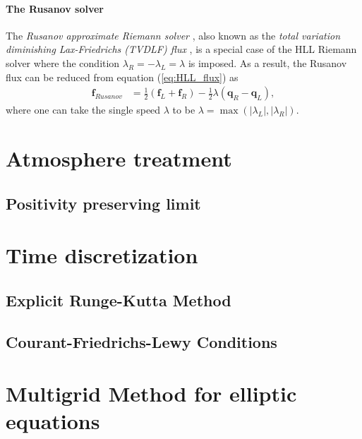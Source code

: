 \paragraph{The Rusanov solver}
The \textit{Rusanov approximate Riemann solver} \cite{rusanov1962calculation},
also known as the \textit{total variation diminishing Lax-Friedrichs (TVDLF) flux} \cite{shu1989efficient},
is a special case of the HLL Riemann solver where the condition $\lambda_R = -\lambda_L = \lambda$ is imposed.
As a result, the Rusanov flux can be reduced from equation (\ref{eq:HLL_flux}) as
\begin{align}
    \mathbf{f}_{Rusanov} &= \frac{1}{2}\left(\mathbf{f}_L + \mathbf{f}_R \right) - \frac{1}{2}\lambda \left(\mathbf{q}_R - \mathbf{q}_L \right),
\end{align}
where one can take the single speed $\lambda$ to be $\lambda = \max\left(|\lambda_L|,|\lambda_R| \right)$.


\section{Atmosphere treatment}
\subsection{Positivity preserving limit}

\section{Time discretization}
\subsection{Explicit Runge-Kutta Method}
\subsection{Courant-Friedrichs-Lewy Conditions}

\section{Multigrid Method for elliptic equations} %
\label{section3.1}


